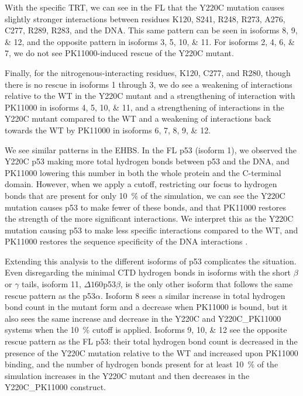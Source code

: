 With the specific TRT, we can see in the FL that the Y220C mutation causes slightly stronger interactions between residues K120, S241, R248, R273, A276, C277, R289, R283, and the DNA. This same pattern can be seen in isoforms \numlist{8;9;12}, and the opposite pattern in isoforms \numlist{3;5;10;11}. For isoforms \numlist{2;4;6;7}, we do not see PK11000-induced rescue of the Y220C mutant.

Finally, for the nitrogenous-interacting residues, K120, C277, and R280, though there is no rescue in isoforms \num{1} through \num{3}, we do see a weakening of interactions relative to the WT in the Y220C mutant and a strengthening of interaction with PK11000 in isoforms \numlist{4;5;10;11}, and a strengthening of interactions in the Y220C mutant compared to the WT and a weakening of interactions back towards the WT by PK11000 in isoforms \numlist{6;7;8;9;12}.

We see similar patterns in the EHBS. In the FL p53 (isoform \num{1}), we observed the Y220C p53 making more total hydrogen bonds between p53 and the DNA, and PK11000 lowering this number in both the whole protein and the C-terminal domain. However, when we apply a cutoff, restricting our focus to hydrogen bonds that are present for only \qty{10}{\percent} of the simulation, we can see the Y220C mutation causes p53 to make fewer of these bonds, and that PK11000 restores the strength of the more significant interactions. We interpret this as the Y220C mutation causing p53 to make less specific interactions compared to the WT, and PK11000 restores the sequence specificity of the DNA interactions \parencite{stetsonRestorationY220CP532025}.

Extending this analysis to the different isoforms of p53 complicates the situation. Even disregarding the minimal CTD hydrogen bonds in isoforms with the short \(\beta\) or \(\gamma\) tails, isoform \num{11}, \(\Delta160\)p53\(\beta\), is the only other isoform that follows the same rescue pattern as the p53\(\alpha\). Isoform \num{8} sees a similar increase in total hydrogen bond count in the mutant form and a decrease when PK11000 is bound, but it also sees the same increase and decrease in the Y220C and Y220C\_PK11000 systems when the \qty{10}{\percent} cutoff is applied. Isoforms \numlist{9;10;12} see the opposite rescue pattern as the FL p53: their total hydrogen bond count is decreased in the presence of the Y220C mutation relative to the WT and increased upon PK11000 binding, and the number of hydrogen bonds present for at least \qty{10}{\percent} of the simulation increases in the Y220C mutant and then decreases in the Y220C\_PK11000 construct.

